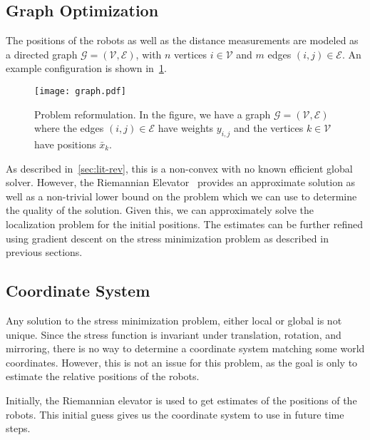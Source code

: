 \subsection{Graph Optimization}
The positions of the robots as well as the distance measurements are modeled as a directed graph $\mathcal{G} = (\mathcal{V}, \mathcal{E})$, with $n$ vertices $i \in \mathcal{V}$ and $m$ edges $(i, j) \in \mathcal{E}$. An example configuration is shown in~\ref{fig:problem-graph}.
\begin{figure}[ht]
    \centering
    \texttt{[image: graph.pdf]}
    \caption{Problem reformulation. In the figure, we have a graph $\mathcal{G}=(\mathcal{V}, \mathcal{E})$ where the edges $(i, j) \in \mathcal{E}$ have weights $y_{i,j}$ and the vertices $k \in \mathcal{V}$ have positions $\bar{x}_k$.}
    \label{fig:problem-graph} 
\end{figure}
As described in~\ref{sec:lit-rev}, this is a non-convex with no known efficient global solver. However, the Riemannian Elevator~\cite{R_elevator} provides an approximate solution as well as a non-trivial lower bound on the problem which we can use to determine the quality of the solution. Given this, we can approximately solve the localization problem for the initial positions. The estimates can be further refined using gradient descent on the stress minimization problem as described in previous sections. 


\subsection{Coordinate System}
Any solution to the stress minimization problem, either local or global is not unique. Since the stress function is invariant under translation, rotation, and mirroring, there is no way to determine a coordinate system matching some world coordinates. However, this is not an issue for this problem, as the goal is only to estimate the relative positions of the robots. 

Initially, the Riemannian elevator is used to get estimates of the positions of the robots. This initial guess gives us the coordinate system to use in future time steps. 


